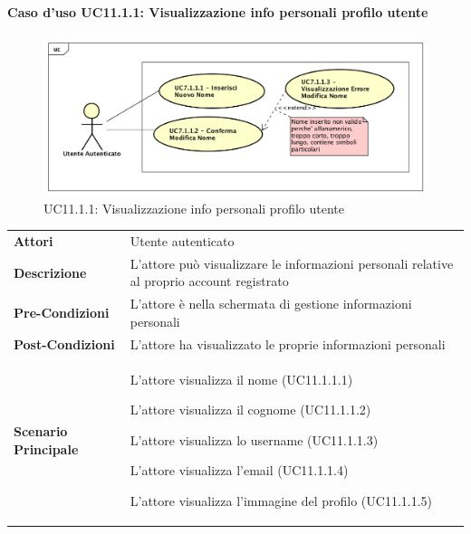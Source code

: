 \paragraph{Caso d'uso UC11.1.1: Visualizzazione info personali profilo utente}
\label{UC11_1_1}
\begin{figure}[ht]
	\centering
	\includegraphics[scale=0.45]{UML/UC7_1_1.png}
	\caption{UC11.1.1: Visualizzazione info personali profilo utente}
\end{figure}
\FloatBarrier
\begin{tabular}{ l | p{11cm}}
	\hline
	\rowcolor{Gray}
	\multicolumn{2}{c}{UC11.1.1 - Visualizzazione info personali profilo utente} \\
	\hline
	\textbf{Attori} & Utente autenticato \\
	\textbf{Descrizione} & L'attore può visualizzare le informazioni personali relative al proprio account registrato\\
	\textbf{Pre-Condizioni} & L'attore è nella schermata di gestione informazioni personali\\
	\textbf{Post-Condizioni} & L'attore ha visualizzato le proprie informazioni personali \\
	\textbf{Scenario Principale} & 
	\begin{enumerate*}[label=(\arabic*.),itemjoin={\newline}]
		\item L'attore visualizza il nome (UC11.1.1.1)
		\item L'attore visualizza il cognome (UC11.1.1.2)
		\item L'attore visualizza lo username (UC11.1.1.3)
		\item L'attore visualizza l'email (UC11.1.1.4)
		\item L'attore visualizza l'immagine del profilo (UC11.1.1.5)
	\end{enumerate*}
\end{tabular}

